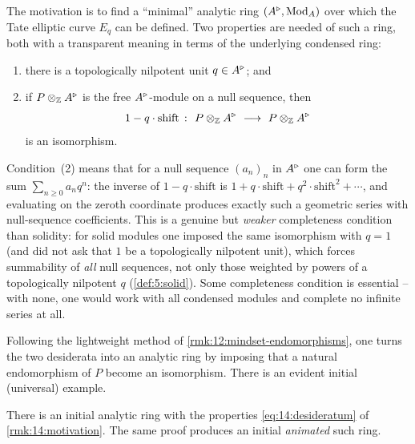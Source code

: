 \begin{remark}
\label{rmk:14:motivation}
The motivation is to find a ``minimal'' analytic ring $(A^{\triangleright},\operatorname{Mod}_A)$ over which
the Tate elliptic curve $E_q$ can be defined. Two properties are needed of such a
ring, both with a transparent meaning in terms of the underlying condensed ring:
\begin{enumerate}
\item there is a topologically nilpotent unit $q\in A^{\triangleright}$; and
\item if $P\otimes_{\mathbb{Z}}A^{\triangleright}$ is the free $A^{\triangleright}$-module on a null
sequence, then
\begin{equation}
\label{eq:14:desideratum}
1-q\cdot\mathrm{shift}\ \colon\ P\otimes_{\mathbb{Z}}\ur A\ \longrightarrow\ P\otimes_{\mathbb{Z}}\ur A
\end{equation}
is an isomorphism.
\end{enumerate}
Condition~(2) means that for a null sequence $(a_n)_n$ in $A^{\triangleright}$ one can form the
sum $\sum_{n\ge 0} a_n q^n$: the inverse of $1-q\cdot\mathrm{shift}$ is
$1+q\cdot\mathrm{shift}+q^2\cdot\mathrm{shift}^2+\cdots$, and evaluating on the
zeroth coordinate produces exactly such a geometric series with null-sequence
coefficients. This is a genuine but \emph{weaker} completeness condition than
solidity: for solid modules one imposed the same isomorphism with $q=1$ (and did
not ask that $1$ be a topologically nilpotent unit), which forces summability of
\emph{all} null sequences, not only those weighted by powers of a topologically
nilpotent $q$ (\cref{def:5:solid}). Some completeness condition is essential --
with none, one would work with all condensed modules and complete no infinite
series at all.
\end{remark}

Following the lightweight method of \cref{rmk:12:mindset-endomorphisms}, one turns
the two desiderata into an analytic ring by imposing that a natural endomorphism of
$P$ become an isomorphism. There is an evident initial (universal) example.

\begin{proposition}
\label{prop:14:initial}
There is an initial analytic ring with the properties \eqref{eq:14:desideratum} of
\cref{rmk:14:motivation}. The same proof produces an initial \emph{animated} such
ring.
\end{proposition}

